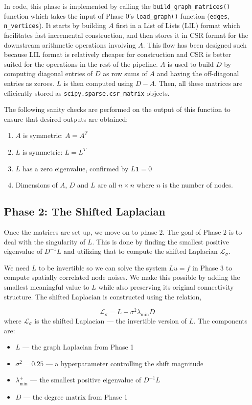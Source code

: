 \documentclass[a4paper,12pt]{amsart}
\numberwithin{equation}{section}
\renewcommand{\L}{{\mathcal L}}
\begin{document}
In code, this phase is implemented by calling the 
\texttt{build\_graph\_matrices()} function which takes the input of 
Phase 0's \texttt{load\_graph()} function (\texttt{edges}, 
\texttt{n\_vertices}). It starts by building $A$ first in a List of 
Lists (LIL) format which facilitates fast incremental construction, 
and then stores it in CSR format for the downstream arithmetic 
operations involving $A$. This flow has been designed such because LIL 
format is relatively cheaper for construction and CSR is better suited 
for the operations in the rest of the pipeline. $A$ is used to build 
$D$ by computing diagonal entries of $D$ as row sums of $A$ and having 
the off-diagonal entries as zeroes. $L$ is then computed using 
$D - A$. Then, all these matrices are efficiently stored as 
\texttt{scipy.sparse.csr\_matrix} objects.

The following sanity checks are performed on the output of this 
function to ensure that desired outputs are obtained:

\begin{enumerate}
    \item $A$ is symmetric: $A = A^T$
    \item $L$ is symmetric: $L = L^T$
    \item $L$ has a zero eigenvalue, confirmed by $L\mathbf{1} = 0$
    \item Dimensions of $A$, $D$ and $L$ are all $n \times n$ where 
    $n$ is the number of nodes.
\end{enumerate}

\subsection{Phase 2: The Shifted Laplacian}

Once the matrices are set up, we move on to phase 2. The goal of Phase 2 is to deal with the singularity of $L$. This is done by finding the smallest positive eigenvalue of $D^{-1}L$ and 
utilizing that to compute the shifted Laplacian $\L_\sigma$.

We need $L$ to be invertible so we can solve the system $Lu = f$ in 
Phase 3 to compute spatially correlated node noises. We make this 
possible by adding the smallest meaningful value to $L$ while also 
preserving its original connectivity structure. The shifted Laplacian 
is constructed using the relation,

\begin{equation}
\L_\sigma = L + \sigma^2 \lambda_{\min} D
\end{equation}
where $\L_\sigma$ is the shifted Laplacian — the invertible version 
of $L$. The components are:
\begin{itemize}[noitemsep, topsep=0pt]
    \item $L$ — the graph Laplacian from Phase 1
    \item $\sigma^2 = 0.25$ — a hyperparameter controlling the shift magnitude
    \item $\lambda^+_{\min}$ — the smallest positive eigenvalue of $D^{-1}L$
    \item $D$ — the degree matrix from Phase 1
\end{itemize}
\end{document}
